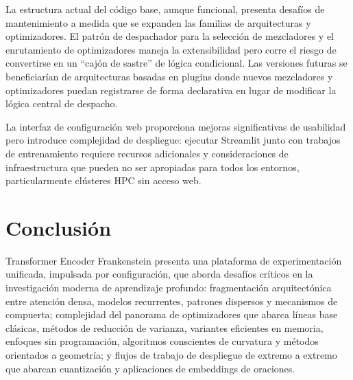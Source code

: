 \documentclass[11pt,a4paper]{article}
\begin{document}
La estructura actual del código base, aunque funcional, presenta desafíos de mantenimiento a medida que se expanden las familias de arquitecturas y optimizadores. El patrón de despachador para la selección de mezcladores y el enrutamiento de optimizadores maneja la extensibilidad pero corre el riesgo de convertirse en un ``cajón de sastre'' de lógica condicional. Las versiones futuras se beneficiarían de arquitecturas basadas en plugins donde nuevos mezcladores y optimizadores puedan registrarse de forma declarativa en lugar de modificar la lógica central de despacho.

La interfaz de configuración web proporciona mejoras significativas de usabilidad pero introduce complejidad de despliegue: ejecutar Streamlit junto con trabajos de entrenamiento requiere recursos adicionales y consideraciones de infraestructura que pueden no ser apropiadas para todos los entornos, particularmente clústeres HPC sin acceso web.

\section{Conclusión}
\label{sec:conclusion}

Transformer Encoder Frankenstein presenta una plataforma de experimentación unificada, impulsada por configuración, que aborda desafíos críticos en la investigación moderna de aprendizaje profundo: fragmentación arquitectónica entre atención densa, modelos recurrentes, patrones dispersos y mecanismos de compuerta; complejidad del panorama de optimizadores que abarca líneas base clásicas, métodos de reducción de varianza, variantes eficientes en memoria, enfoques sin programación, algoritmos conscientes de curvatura y métodos orientados a geometría; y flujos de trabajo de despliegue de extremo a extremo que abarcan cuantización y aplicaciones de embeddings de oraciones.
\end{document}
